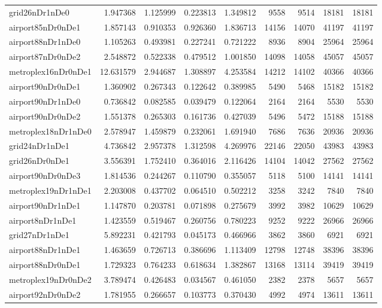\begin{longtable}{|l|r|r|r|r|r|r|r|r|}
grid26nDr1nDe0 & 1.947368 & 1.125999 & 0.223813 & 1.349812 & 9558 & 9514 & 18181 & 18181 \\
airport85nDr0nDe1 & 1.857143 & 0.910353 & 0.926360 & 1.836713 & 14156 & 14070 & 41197 & 41197 \\
airport88nDr1nDe0 & 1.105263 & 0.493981 & 0.227241 & 0.721222 & 8936 & 8904 & 25964 & 25964 \\
airport87nDr0nDe2 & 2.548872 & 0.522338 & 0.479512 & 1.001850 & 14098 & 14058 & 45057 & 45057 \\
metroplex16nDr0nDe1 & 12.631579 & 2.944687 & 1.308897 & 4.253584 & 14212 & 14102 & 40366 & 40366 \\
airport90nDr0nDe1 & 1.360902 & 0.267343 & 0.122642 & 0.389985 & 5490 & 5468 & 15182 & 15182 \\
airport90nDr1nDe0 & 0.736842 & 0.082585 & 0.039479 & 0.122064 & 2164 & 2164 & 5530 & 5530 \\
airport90nDr0nDe2 & 1.551378 & 0.265303 & 0.161736 & 0.427039 & 5496 & 5472 & 15188 & 15188 \\
metroplex18nDr1nDe0 & 2.578947 & 1.459879 & 0.232061 & 1.691940 & 7686 & 7636 & 20936 & 20936 \\
grid24nDr1nDe1 & 4.736842 & 2.957378 & 1.312598 & 4.269976 & 22146 & 22050 & 43983 & 43983 \\
grid26nDr0nDe1 & 3.556391 & 1.752410 & 0.364016 & 2.116426 & 14104 & 14042 & 27562 & 27562 \\
airport90nDr0nDe3 & 1.814536 & 0.244267 & 0.110790 & 0.355057 & 5118 & 5100 & 14141 & 14141 \\
metroplex19nDr1nDe1 & 2.203008 & 0.437702 & 0.064510 & 0.502212 & 3258 & 3242 & 7840 & 7840 \\
airport90nDr1nDe1 & 1.147870 & 0.203781 & 0.071898 & 0.275679 & 3992 & 3982 & 10629 & 10629 \\
airport8nDr1nDe1 & 1.423559 & 0.519467 & 0.260756 & 0.780223 & 9252 & 9222 & 26966 & 26966 \\
grid27nDr1nDe1 & 5.892231 & 0.421793 & 0.045173 & 0.466966 & 3862 & 3860 & 6921 & 6921 \\
airport88nDr1nDe1 & 1.463659 & 0.726713 & 0.386696 & 1.113409 & 12798 & 12748 & 38396 & 38396 \\
airport88nDr0nDe1 & 1.729323 & 0.764233 & 0.618634 & 1.382867 & 13168 & 13114 & 39419 & 39419 \\
metroplex19nDr0nDe2 & 3.789474 & 0.426483 & 0.034567 & 0.461050 & 2382 & 2378 & 5657 & 5657 \\
airport92nDr0nDe2 & 1.781955 & 0.266657 & 0.103773 & 0.370430 & 4992 & 4974 & 13611 & 13611 \\

\end{longtable}
